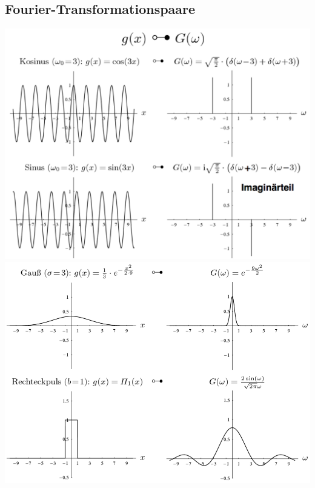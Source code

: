 \documentclass[10pt]{article}
\begin{document}
\subsection{Fourier-Transformationspaare}
\begin{center}
	\includegraphics[scale=0.225]{ft-paar-1.png}
	\hspace{0.5cm}
	\includegraphics[scale=0.225]{ft-paar-2.png}
\end{center}
\end{document}
